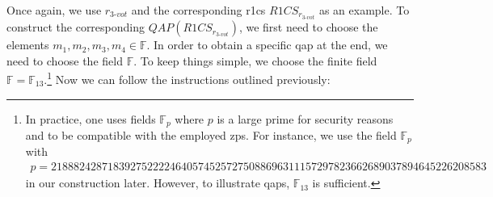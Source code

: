 Once again, we use $r_{3\text{-}vot}$ and the corresponding \gls{r1cs} $R1CS_{r_{3\text{-}vot}}$ as an example.
To construct the corresponding $QAP(R1CS_{r_{3\text{-}vot}})$, we first need to choose the elements $m_1,m_2,m_3,m_4\in\mathbb{F}$.
In order to obtain a specific \gls{qap} at the end, we need to choose the field $\mathbb{F}$.
To keep things simple, we choose the finite field $\mathbb{F}=\mathbb{F}_{13}$.\footnote{
    \label{footnote:basefieldExample}
    In practice, one uses fields $\mathbb{F}_p$ where $p$ is a large prime for security reasons and to be compatible with the employed \gls{zps}.
    For instance, we use the field $\mathbb{F}_p$ with \begin{align*}
        \scriptstyle p=21888242871839275222246405745257275088696311157297823662689037894645226208583
    \end{align*}
    in our construction later.
    However, to illustrate \glspl{qap}, $\mathbb{F}_{13}$ is sufficient.
}
Now we can follow the instructions outlined previously:
